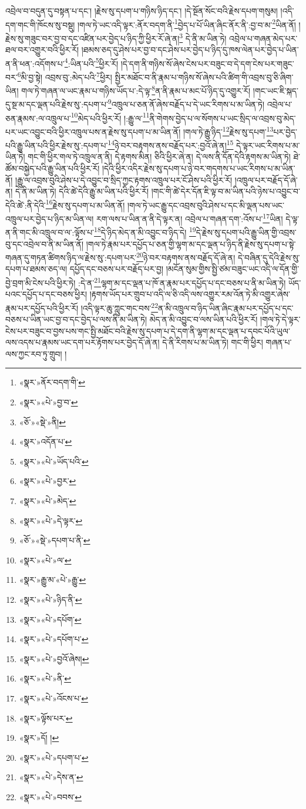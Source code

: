 འབྲེལ་བ་བདུན་དུ་བསྟན་པ་དང་། །རྗེས་སུ་དཔག་པ་གཉིས་ཉིད་དང་། །དེ་སྔོན་སོང་བའི་རྗེས་དཔག་གསུམ། །འདི་དག་གང་གི་ཁོངས་སུ་བསྡུ། །གལ་ཏེ་ཡང་འདི་ལྟར་:ནོར་བདག་ནི་\footnote{«སྣར་»ནོར་བདག་གི་}བྱེད་པ་པོ་ཡིན་ཞིང་ནོར་ནི་:བྱ་བ་མ་\footnote{«སྣར་»«པེ་»བྱ་བ་}ཡིན་ནོ། །རྗེས་སུ་གཟུང་བར་བྱ་བ་དང་འཛིན་པར་བྱེད་པ་ཉིད་ཀྱི་ཕྱིར་རོ་ཞེ་ན།\footnote{«ཅོ་»«སྡེ་»ནི།} དེ་ནི་མ་ཡིན་ཏེ། འབྲེལ་པ་གཞན་མེད་པར་ཐལ་བར་འགྱུར་བའི་ཕྱིར་རོ། །ཐམས་ཅད་དུ་ཤེས་པར་བྱ་བ་དང་ཤེས་པར་བྱེད་པ་ཉིད་དུ་ཁས་ལེན་པར་བྱེད་པ་ཡིན་ན་ནི་ཕན་:འདོགས་པ་\footnote{«སྣར་»འདོན་པ་}:ཡིན་པའི་\footnote{«སྣར་»«པེ་»ཡོད་པའི་}ཕྱིར་རོ། །དེ་དག་ནི་གཉིས་སོ་ཞེས་ངེས་པར་བཟུང་བ་དེ་དག་ངེས་པར་གཟུང་བར་\footnote{«སྣར་»«པེ་»བྱར་}མི་བྱ་སྟེ། འབྲས་བུ་:མེད་པའི་\footnote{«སྣར་»«པེ་»མེད་}ཕྱིར། སྤྱིར་མཐོང་བ་ནི་རྣམ་པ་གཉིས་སོ་ཞེས་པའི་ཚིག་གི་འབྲས་བུ་ཅི་ཞིག་ཡིན། གལ་ཏེ་གཞན་ལ་ཡང་རྣམ་པ་གཉིས་ཡོད་པ་:དེ་ལྟ་\footnote{«སྣར་»«པེ་»དེ་ལྟར་}ན་ནི་རྣམ་པ་མང་པོ་ཉིད་དུ་འགྱུར་རོ། །གང་ཡང་ཇི་སྐད་དུ་སྔ་མ་དང་ལྡན་པའི་རྗེས་སུ་:དཔག་པ་\footnote{«ཅོ་»«སྡེ་»དཔག་པ་ནི་}འཁྲུལ་པ་ཅན་ནོ་ཞེས་བརྗོད་པ་དེ་ཡང་རིགས་པ་མ་ཡིན་ཏེ། འབྲེལ་པ་ཅན་རྣམས་:ལ་འཁྲུལ་པ་\footnote{«སྣར་»«པེ་»ལ་}མེད་པའི་ཕྱིར་རོ། །:རྒྱུ་ལ་\footnote{«སྣར་»རྒྱུ་མ་«པེ་»རྒྱུ་}ནི་གེགས་བྱེད་པ་ལ་སོགས་པ་ཡང་སྲིད་ལ་འབྲས་བུ་མེད་པར་ཡང་འབྱུང་བའི་ཕྱིར་འཁྲུལ་པས་ན་རྗེས་སུ་དཔག་པ་མ་ཡིན་ནོ། །གལ་ཏེ་རྒྱུ་ཉིད་\footnote{«སྣར་»«པེ་»ཉིད་ནི་}རྗེས་སུ་དཔག་\footnote{«སྣར་»«པེ་»དཔོག་}པར་བྱེད་པའི་རྒྱུ་ཡིན་པའི་ཕྱིར་རྗེས་སུ་:དཔག་པ་\footnote{«སྣར་»«པེ་»དཔོག་པ་}ཉེ་བར་བརྟགས་ནས་བརྗོད་པར་:བྱའོ་ཞེ་ན།\footnote{«སྣར་»«པེ་»བྱའོ་ཞེས།} དེ་ལྟར་ཡང་རིགས་པ་མ་ཡིན་ཏེ། གང་གི་ཕྱིར་གལ་ཏེ་འཁྲུལ་ན་ནི། དེ་རྟགས་མིན། ཅིའི་ཕྱིར་ཞེ་ན། དེ་ལས་ནི་དོན་དེའི་རྟགས་མ་ཡིན་ཏེ། ཐེ་ཚོམ་བསྐྱེད་པའི་རྒྱུ་ཡིན་པའི་ཕྱིར་རོ། །དེའི་ཕྱིར་འདིར་རྗེས་སུ་དཔག་པ་ཉེ་བར་གདགས་པ་ཡང་རིགས་པ་མ་ཡིན་ནོ། །རྒྱུ་ལ་འབྲས་བུའི་ཤེས་པ་དེ་འབྱུང་བ་སྲིད་ཀྱང་རྟགས་འཁྲུལ་པར་ངོ་ཤེས་པའི་ཕྱིར་རོ། །འཁྲུལ་པར་བརྗོད་དོ་ཞེ་ན། དེ་ནི་མ་ཡིན་ཏེ། དེའི་ཚེ་དེའི་རྒྱུ་མ་ཡིན་པའི་ཕྱིར་རོ། །གང་གི་ཚེ་དེར་དོན་ཇི་ལྟ་བ་མ་ཡིན་པའི་ཉེས་པ་འབྱུང་བ་དེའི་ཚེ་:ནི་དེའི་\footnote{«སྣར་»«པེ་»ནི་}རྗེས་སུ་དཔག་པ་མ་ཡིན་ནོ། །གལ་ཏེ་ཡང་རྒྱུ་དང་འབྲས་བུའི་ཤེས་པ་དང་མི་ལྡན་པས་ཡང་འཁྲུལ་པར་བྱེད་པ་ཉིད་མ་ཡིན་ལ། རག་ལས་པ་ཡིན་ན་ནི་དེ་ལྟར་ན། འབྲེལ་པ་གཞན་དག་:འོས་པ་\footnote{«སྣར་»«པེ་»འོངས་པ་}ཡིན། དེ་ལྟ་ན་ནི་གང་མི་འཁྲུལ་བ་ལ་:ལྟོས་པ་\footnote{«སྣར་»ལྟོས་པར་}དེ་ཉིད་མེད་ན་མི་འབྱུང་བ་ཉིད་དེ། \footnote{«སྣར་»དོ། ། }དེ་རྗེས་སུ་དཔག་པའི་རྒྱུ་ཡིན་གྱི་འབྲས་བུ་དང་འབྲེལ་བ་ནི་མ་ཡིན་ནོ། །གལ་ཏེ་རྣམ་པར་དཔྱོད་པ་ཅན་གྱི་ལྷག་མ་དང་ལྡན་པ་ཉིད་ནི་རྗེས་སུ་དཔག་པ་སྟེ་གཞན་དུ་གཏན་ཚིགས་ཉིད་ལ་རྗེས་སུ་:དཔག་པར་\footnote{«སྣར་»«པེ་»དཔག་པ་}ཉེ་བར་བརྟགས་ནས་བརྗོད་དོ་ཞེ་ན། དེ་བཞིན་དུ་དེའི་རྗེས་སུ་དཔག་པ་ཐམས་ཅད་ལ། དཔྱོད་དང་བཅས་པར་བརྗོད་པར་བྱ། །མངོན་སུམ་གྱིས་སྤྱི་ཙམ་བཟུང་ཡང་འདི་ལ་དོན་གྱི་བྱེ་བྲག་མི་ངེས་པའི་ཕྱིར་ཏེ། :དེ་ན་\footnote{«སྣར་»«པེ་»དེས་ན་}ལྷག་མ་དང་ལྡན་པ་ཁོ་ན་རྣམ་པར་དཔྱོད་པ་དང་བཅས་པ་ནི་མ་ཡིན་ཏེ། ཡོད་པའང་དཔྱོད་པ་དང་བཅས་ཕྱིར། །རྟགས་ཡོད་པར་གྲུབ་པ་འདི་ལ་ཅི་འདི་ལས་འགྱུར་རམ་འོན་ཏེ་མི་འགྱུར་ཞེས་རྣམ་པར་དཔྱོད་པའི་ཕྱིར་རོ། །འདི་ལྟར་ཆུ་ཀླུང་གང་བས་\footnote{«སྣར་»«པེ་»བབས་}ན་མི་འཁྲུལ་བ་ཉིད་ཡིན་ཞིང་རྣམ་པར་དཔྱོད་པ་དང་བཅས་པ་ཡིན་ཡང་བྱ་བ་དང་བྱེད་པ་ལས་ནི་མ་ཡིན་ཏེ། མེད་ན་མི་འབྱུང་བ་ལས་ཡིན་པའི་ཕྱིར་རོ། །གལ་ཏེ་དེ་ལྟར་ངེས་པར་བཟུང་བ་བྱས་པས་གང་སྤྱི་མཐོང་བའི་རྗེས་སུ་དཔག་པ་དེ་དག་ནི་ལྷག་མ་དང་ལྡན་པ་དབང་པོའི་ཡུལ་ལས་འདས་པ་རྣམས་ཡང་དག་པར་རྟོགས་པར་བྱེད་དོ་ཞེ་ན། དེ་ནི་རིགས་པ་མ་ཡིན་ཏེ། གང་གི་ཕྱིར། གཞན་པ་ལས་ཀྱང་རབ་ཏུ་གྲུབ། །
